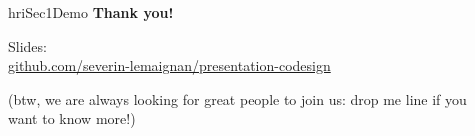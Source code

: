 \documentclass[xcolor=table]{beamer}
\begin{document}



{
    \begin{frame}[plain]

        \begin{columns}
            \begin{column}{0.5\linewidth}
            \end{column}
            \begin{column}{0.5\linewidth}

                \vspace{14em}
                \begin{beamercolorbox}[wd=\linewidth,ht=6ex,dp=0.7ex]{hriSec1Demo}
                    \textbf{Thank you!}

                    \vspace{4em}

                    \footnotesize
                    Slides:\\
                    \href{https://github.com/severin-lemaignan/presentation-codesign}{github.com/severin-lemaignan/presentation-codesign}

                    \vspace{2em}

                    (btw, we are always looking for great people to join us: drop me line if you want to know more!)

                \end{beamercolorbox}
            \end{column}
        \end{columns}
    \end{frame}
}

\appendix
{}
\end{document}
